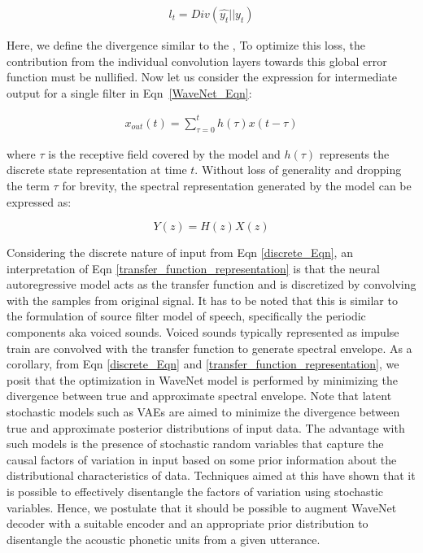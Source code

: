 \begin{equation} \label{discrete_Eqn}
\begin{split}
  l_t = Div(\hat{y_t} || y_t)
\end{split}
\end{equation} 

Here, we define the divergence similar to the \citep{salimans2017pixelcnn++}, To optimize this loss, the contribution from the individual convolution layers towards this global error function must be nullified. Now let us consider the expression for intermediate output for a single filter in Eqn~\ref{WaveNet_Eqn}:

\begin{equation}
\begin{split}
  x_{out}(t) = \sum_{\tau=0}^{t} h(\tau)x(t-\tau)
\end{split}
\end{equation} 

\noindent where $\tau$ is the receptive field covered by the model and $h(\tau)$ represents the discrete state representation at time $t$. Without loss of generality and dropping the term $\tau$ for brevity, the spectral representation generated by the model can be expressed as:

\begin{equation} \label{transfer_function_representation}
  Y(z)  = H(z) X(z) 
\end{equation} 


Considering the discrete nature of input from Eqn \ref{discrete_Eqn}, an interpretation of Eqn \ref{transfer_function_representation} is that the neural autoregressive model acts as the transfer function and is discretized by convolving with the samples from original signal. It has to be noted that this is similar to the formulation of source filter model of speech, specifically the periodic components aka voiced sounds. Voiced sounds typically represented as impulse train are convolved with the transfer function to generate spectral envelope. As a corollary, from Eqn \ref{discrete_Eqn} and \ref{transfer_function_representation}, we posit that the optimization in WaveNet model is performed by minimizing the divergence between true and approximate spectral envelope. Note that latent stochastic models such as VAEs are aimed to minimize the divergence between true and approximate posterior distributions of input data. The advantage with such models is the presence of stochastic random variables that capture the causal factors of variation in input based on some prior information about the distributional characteristics of data. Techniques aimed at this \citep{beta_vae} have shown that it is possible to effectively disentangle the factors of variation using stochastic variables. Hence, we postulate that it should be possible to augment WaveNet decoder with a suitable encoder and an appropriate prior distribution to disentangle the acoustic phonetic units from a given utterance. 


